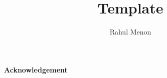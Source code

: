 \documentclass{article}
\title{Template}
\author{Rahul Menon}
\date{}
\numberwithin{equation}{subsection}
\begin{document}
\maketitle

\paragraph{Acknowledgement}

\tableofcontents

\pagebreak

\section{}

\end{document}
